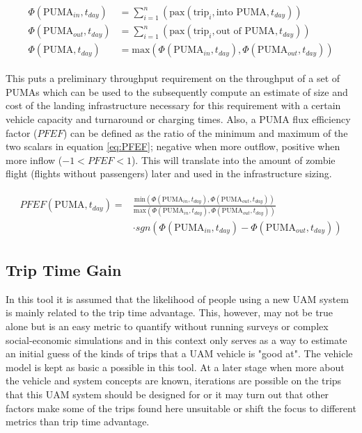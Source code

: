 \begin{align} \label{eq:PUMAflux}
    \begin{split}
    \Phi(\text{PUMA}_{in}, t_{day}) &= \sum_{i=1}^n{ \left( \text{pax}(\text{trip}_i, \text{into   PUMA}, t_{day})\right)}\\
    \Phi(\text{PUMA}_{out}, t_{day}) &= \sum_{i=1}^n{ \left( \text{pax}(\text{trip}_i, \text{out of PUMA}, t_{day})\right)}\\
    \Phi(\text{PUMA}, t_{day}) &= \text{max} 
    \left(
        \Phi(\text{PUMA}_{in}, t_{day}),
        \Phi(\text{PUMA}_{out}, t_{day})
    \right)
    \end{split}
\end{align}

This puts a preliminary throughput requirement on the throughput of a set of PUMAs which can be used to the subsequently compute an estimate of size and cost of the landing infrastructure necessary for this requirement with a certain vehicle capacity and turnaround or charging times. Also, a PUMA flux efficiency factor ($PFEF$) can be defined as the ratio of the minimum and maximum of the two scalars in equation \ref{eq:PFEF}; negative when more outflow, positive when more inflow ($-1 < PFEF < 1$). This will translate into the amount of zombie flight (flights without passengers) later and used in the infrastructure sizing.

\begin{align} \label{eq:PFEF}
    \begin{split}
        PFEF(\text{PUMA}, t_{day}) = &\frac{\text{min} 
        \left(
            \Phi(\text{PUMA}_{in}, t_{day}),
            \Phi(\text{PUMA}_{out}, t_{day})
        \right)
        }{\text{max} 
        \left(
            \Phi(\text{PUMA}_{in}, t_{day}),
            \Phi(\text{PUMA}_{out}, t_{day})
        \right)
        } \\
        &\cdot sgn ( \Phi(\text{PUMA}_{in}, t_{day}) - \Phi(\text{PUMA}_{out}, t_{day}) )
    \end{split}
\end{align}







\iffalse
\subsection{Trip Time Gain}

In this tool it is assumed that the likelihood of people using a new UAM system is mainly related to the trip time advantage. This, however, may not be true alone but is an easy metric to quantify without running surveys or complex social-economic simulations and in this context only serves as a way to estimate an initial guess of the kinds of trips that a UAM vehicle is "good at". The vehicle model is kept as basic a possible in this tool. At a later stage when more about the vehicle and system concepts are known, iterations are possible on the trips that this UAM system should be designed for or it may turn out that other factors make some of the trips found here unsuitable or shift the focus to different metrics than trip time advantage.

